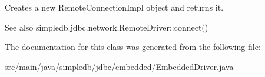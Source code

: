 Creates a new Remote\+Connection\+Impl object and returns it. \begin{DoxySeeAlso}{See also}
simpledb.\+jdbc.\+network.\+Remote\+Driver\+::connect() 
\end{DoxySeeAlso}


The documentation for this class was generated from the following file\+:\begin{DoxyCompactItemize}
\item 
src/main/java/simpledb/jdbc/embedded/Embedded\+Driver.\+java\end{DoxyCompactItemize}
